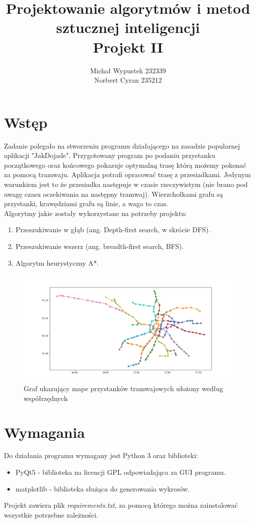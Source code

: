 \documentclass[12pt, polish]{article}
\title{\textbf{Projektowanie algorytmów i metod sztucznej inteligencji} \\ Projekt II}
\author{Michał Wypustek 232339 \\
		Norbert Cyran 235212}
\begin{document}
\maketitle
\tableofcontents


\newpage
\section {Wstęp}
	Zadanie polegało na stworzeniu programu działającego na zasadzie popularnej aplikacji "JakDojade". Przygotowany program po podaniu przystanku początkowego oraz końcowego pokazuje optymalną trasę którą możemy pokonać za pomocą tramwaju. Aplikacja potrafi opracować trasę z przesiadkami. Jedynym warunkiem jest to że przesiadka następuje w czasie rzeczywistym (nie brano pod uwagę czasu oczekiwania na następny tramwaj). Wierzchołkami grafu są przystanki, krawędziami grafu są linie, a waga to czas. 
	\\
	Algorytmy jakie zostały wykorzystane na potrzeby projektu:
	\begin{enumerate}
		\item Przeszukiwanie w głąb (ang. Depth-first search, w skrócie DFS).
		\item Przeszukiwanie wszerz (ang. breadth-first search, BFS).
		\item Algorytm heurystyczny A*.
	\end{enumerate}
	
	\begin{figure}[ht]
	\centering

		\includegraphics[width=1.0\textwidth]{images/graf.png}
	
	\caption{Graf ukazujący mape przystanków tramwajowych ułożony według współrzędnych}
	

	\end{figure}

\section{Wymagania}
Do działania programu wymagany jest Python 3 oraz biblioteki:
\begin{itemize}
    \item PyQt5 - biblioteka na licencji GPL odpowiadająca za GUI programu.
    \item matplotlib - biblioteka służąca do generowania wykresów.
\end{itemize}
Projekt zawiera plik \textit{requirements.txt}, za pomocą którego można zainstalować wszystkie potrzebne zależności.
\end{document}
